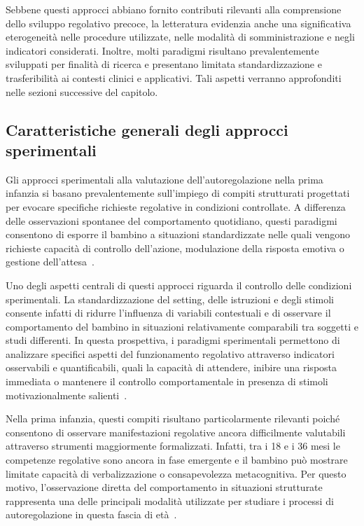         Sebbene questi approcci abbiano fornito contributi rilevanti alla comprensione dello sviluppo regolativo precoce, la letteratura evidenzia anche una significativa eterogeneità nelle procedure utilizzate, nelle modalità di somministrazione e negli indicatori considerati. Inoltre, molti paradigmi risultano prevalentemente sviluppati per finalità di ricerca e presentano limitata standardizzazione e trasferibilità ai contesti clinici e applicativi. Tali aspetti verranno approfonditi nelle sezioni successive del capitolo.

        \subsection{Caratteristiche generali degli approcci sperimentali}
        \label{sec:3_4_1}

            Gli approcci sperimentali alla valutazione dell'autoregolazione nella prima infanzia si basano prevalentemente sull'impiego di compiti strutturati progettati per evocare specifiche richieste regolative in condizioni controllate. A differenza delle osservazioni spontanee del comportamento quotidiano, questi paradigmi consentono di esporre il bambino a situazioni standardizzate nelle quali vengono richieste capacità di controllo dell'azione, modulazione della risposta emotiva o gestione dell'attesa~\cite{hughes2002}.

            Uno degli aspetti centrali di questi approcci riguarda il controllo delle condizioni sperimentali. La standardizzazione del setting, delle istruzioni e degli stimoli consente infatti di ridurre l'influenza di variabili contestuali e di osservare il comportamento del bambino in situazioni relativamente comparabili tra soggetti e studi differenti. In questa prospettiva, i paradigmi sperimentali permettono di analizzare specifici aspetti del funzionamento regolativo attraverso indicatori osservabili e quantificabili, quali la capacità di attendere, inibire una risposta immediata o mantenere il controllo comportamentale in presenza di stimoli motivazionalmente salienti~\cite{garon2008,carlson2005}.

            Nella prima infanzia, questi compiti risultano particolarmente rilevanti poiché consentono di osservare manifestazioni regolative ancora difficilmente valutabili attraverso strumenti maggiormente formalizzati. Infatti, tra i 18 e i 36 mesi le competenze regolative sono ancora in fase emergente e il bambino può mostrare limitate capacità di verbalizzazione o consapevolezza metacognitiva. Per questo motivo, l'osservazione diretta del comportamento in situazioni strutturate rappresenta una delle principali modalità utilizzate per studiare i processi di autoregolazione in questa fascia di età~\cite{mcclelland2012}.

